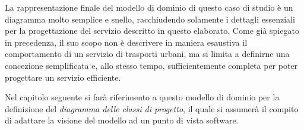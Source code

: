 \vspace{1cm}
La rappresentazione finale del modello di dominio di questo caso di studio è un diagramma molto semplice e snello, racchiudendo solamente i dettagli essenziali per la progettazione del servizio descritto in questo elaborato.
Come già spiegato in precedenza, il suo scopo non è descrivere in maniera esaustiva il comportamento di un servizio di trasporti urbani, ma si limita a definirne una concezione semplificata e, allo stesso tempo, sufficientemente completa per poter progettare un servizio efficiente.

Nel capitolo seguente si farà riferimento a questo modello di dominio per la definizione del {\itshape diagramma delle classi di progetto}, il quale si assumerà il compito di adattare la visione del modello ad un punto di vista software.

\newpage